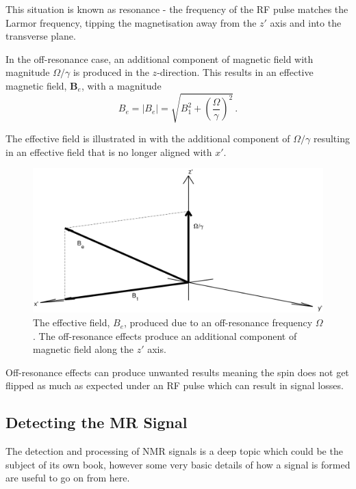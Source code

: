 This situation is known as resonance - the frequency of the \ac{RF} pulse matches the Larmor frequency, tipping the magnetisation away from the $z'$ axis and into the transverse plane. 

In the off-resonance case, an additional component of magnetic field with magnitude $\Omega/\gamma$ is produced in the $z$-direction.
This results in an effective magnetic field, $\mathbf{B}_e$, with a magnitude \cite{DeGraaf2007}
\begin{equation}
	B_e = |B_e| = \sqrt{B_1^2 + \left(\frac{\Omega}{\gamma}\right)^2}\,.
	\label{eq:Beff}
\end{equation}

The effective field is illustrated in  with the additional component of $\Omega/\gamma$ resulting in an effective field that is no longer aligned with $x'$.
\begin{figure}
	\centering
	\includegraphics[width=\textwidth]{figures/background/B_e.eps}
	\caption{The effective field, $B_e$, produced due to an off-resonance frequency $\Omega$. The off-resonance effects produce an additional component of magnetic field along the $z'$ axis.}
	\label{fig:B_e}	
\end{figure}
Off-resonance effects can produce unwanted results meaning the spin does not get flipped as much as expected under an \ac{RF} pulse which can result in signal losses. 
 

\subsection{Detecting the MR Signal}
The detection and processing of \ac{NMR} signals is a deep topic which could be the subject of its own book, however some very basic details of how a signal is formed are useful to go on from here.
 

